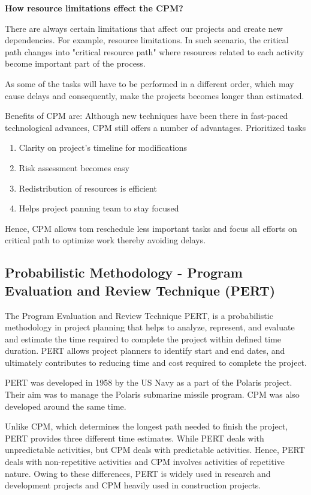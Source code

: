 \textbf{How resource limitations effect the CPM?}

There are always certain limitations that affect our projects and create new dependencies. For example, resource limitations. In such scenario, the critical path changes into "critical resource path" where resources related to each activity become important part of the process.

As some of the tasks will have to be performed in a different order, which may cause delays and consequently, make the projects becomes longer than estimated.


Benefits of CPM are:
Although new techniques have been there in fast-paced technological advances, CPM still offers a number of advantages.
Prioritized tasks 
\begin{enumerate}
	\item Clarity on project's timeline for modifications 
	\item Risk assessment becomes easy 
	\item Redistribution of resources is efficient 
	\item Helps project panning team to stay focused

\end{enumerate}

Hence, CPM allows tom reschedule less important tasks and focus all efforts on critical path to optimize work thereby avoiding delays.

\subsection{Probabilistic   Methodology - Program Evaluation and Review Technique (PERT)}

The Program Evaluation and Review Technique PERT\cite{activecolab}, is a probabilistic methodology in project planning that helps to analyze, represent, and evaluate and estimate the time required to complete the project within defined time duration. PERT allows project planners to identify start and end dates, and ultimately contributes to reducing time and cost required to complete the project.

PERT was developed in 1958 by the US Navy as a part of the Polaris project. Their aim was to manage the Polaris submarine missile program. CPM was also developed around the same time.

Unlike CPM, which determines the longest path needed to finish the project, PERT provides three different time estimates. While PERT deals with unpredictable activities, but CPM deals with predictable activities. Hence, PERT deals with non-repetitive activities and CPM involves activities of repetitive nature. Owing to these differences, PERT is widely used in research and development projects and CPM heavily used in construction projects.

